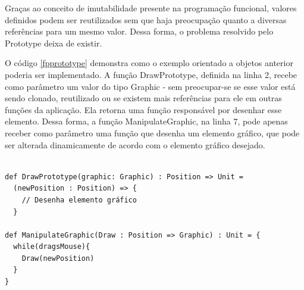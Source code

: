 Graças ao conceito de imutabilidade presente na 
programação funcional, valores definidos podem 
ser reutilizados sem que haja preocupação 
quanto a diversas referências para um mesmo valor. 
Dessa forma, o problema resolvido pelo Prototype 
deixa de existir. 

O código \ref{fpprototype} demonstra como o 
exemplo orientado a objetos anterior poderia 
ser implementado. A função DrawPrototype, 
definida na linha 2, recebe como parâmetro um 
valor do tipo Graphic - sem preocupar-se se 
esse valor está sendo clonado, reutilizado ou 
se existem mais referências para ele em outras 
funções da aplicação. Ela retorna uma função 
responsável por desenhar esse elemento. Dessa 
forma, a função ManipulateGraphic, na linha 
7, pode apenas receber como parâmetro uma função 
que desenha um elemento gráfico, que pode ser 
alterada dinamicamente de acordo com o elemento 
gráfico desejado.

\begin{lstlisting}[caption={Prototype Funcional},label=fpprototype]
    
def DrawPrototype(graphic: Graphic) : Position => Unit =
  (newPosition : Position) => {
    // Desenha elemento gráfico
  }

def ManipulateGraphic(Draw : Position => Graphic) : Unit = {
  while(dragsMouse){
    Draw(newPosition)
  }
}
    
\end{lstlisting}